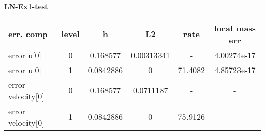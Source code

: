 \documentclass{amsart}
\begin{document}
\begin{center}   
{\bf LN-Ex1-test }\end{center}  
\tableofcontents

\begin{table}[h!]
\begin{tabular}{|l|c|c|c|c|c|}
\hline
err. comp & level & h  & L2 & rate  & local mass err \\ 
\hline
error u[0] & 0 & 0.168577  & 0.00313341 & -   &  4.00274e-17 \\ 
error u[0] & 1 & 0.0842886 & 0 & 71.4082   &  4.85723e-17 \\ 
error velocity[0] & 0 & 0.168577  & 0.0711187 & -   & - \\ 
error velocity[0] & 1 & 0.0842886 & 0 & 75.9126   & - \\ 

\hline
\end{tabular}
\end{table}
\end{document}
